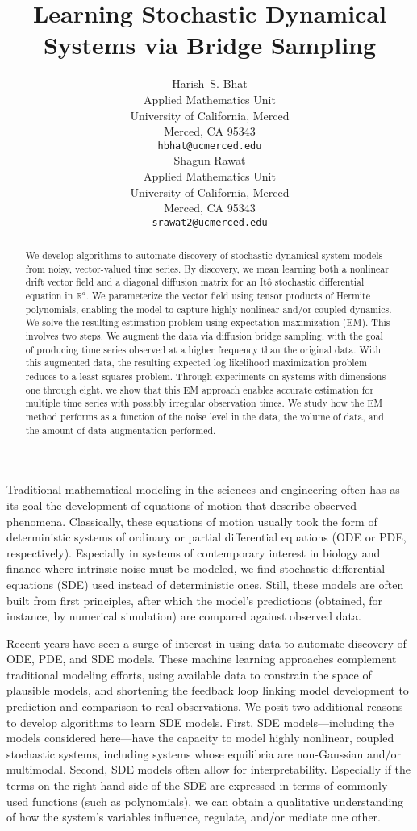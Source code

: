 \documentclass{article}
\title{Learning Stochastic Dynamical Systems via Bridge Sampling}
\author{
 Harish~S. Bhat\\
 Applied Mathematics Unit\\
 University of California, Merced\\
 Merced, CA 95343\\
 \texttt{hbhat@ucmerced.edu} \\
 \And
 Shagun Rawat\\
 Applied Mathematics Unit\\
 University of California, Merced\\
 Merced, CA 95343\\
 \texttt{srawat2@ucmerced.edu}
}
\begin{document}
\maketitle


\begin{abstract}
  We develop algorithms to automate discovery of stochastic dynamical system
  models from noisy, vector-valued time series.  By discovery, we mean 
  learning both a nonlinear drift vector field and a diagonal diffusion matrix 
  for an It\^{o} stochastic differential equation in $\mathbb{R}^d$.  We 
  parameterize the vector field using tensor products of Hermite polynomials,
  enabling the model to capture highly nonlinear and/or coupled dynamics.
  We solve the resulting estimation problem using expectation maximization (EM).
  This involves two steps.  We augment the data via diffusion bridge
  sampling, with the goal of producing time series observed at a higher
  frequency than the original data.  With this augmented data,
  the resulting expected log likelihood maximization problem
  reduces to a least squares problem.  Through experiments on systems with 
  dimensions one through eight, we show that this EM approach enables 
  accurate estimation for multiple time series with possibly irregular 
  observation times.  We study how the EM method performs as a function of
  the noise level in the data, the volume of data, and the amount of data
  augmentation performed.  
\end{abstract}

Traditional mathematical modeling in the sciences and engineering often has as its goal the development of equations of motion that describe observed phenomena.  Classically, these equations of motion usually took the form of deterministic systems of ordinary or partial differential equations (ODE or PDE, respectively).  Especially in systems of contemporary interest in biology and finance where intrinsic noise must be modeled, we find stochastic differential equations (SDE) used instead of deterministic ones.  Still, these models are often built from first principles, after which the model's predictions (obtained, for instance, by numerical simulation) are compared against observed data.

Recent years have seen a surge of interest in using data to automate discovery of ODE, PDE, and SDE models.  These machine learning approaches complement traditional modeling efforts, using available data to constrain the space of plausible models, and shortening the feedback loop linking model development to prediction and comparison to real observations.  We posit two additional reasons to develop algorithms to learn SDE models.  First, SDE models---including the models considered here---have the capacity to model highly nonlinear, coupled stochastic systems, including systems whose equilibria are non-Gaussian and/or multimodal.  Second, SDE models often allow for interpretability.  Especially if the terms on the right-hand side of the SDE are expressed in terms of commonly used functions (such as polynomials), we can obtain a qualitative understanding of how the system's variables influence, regulate, and/or mediate one other. 
\end{document}
